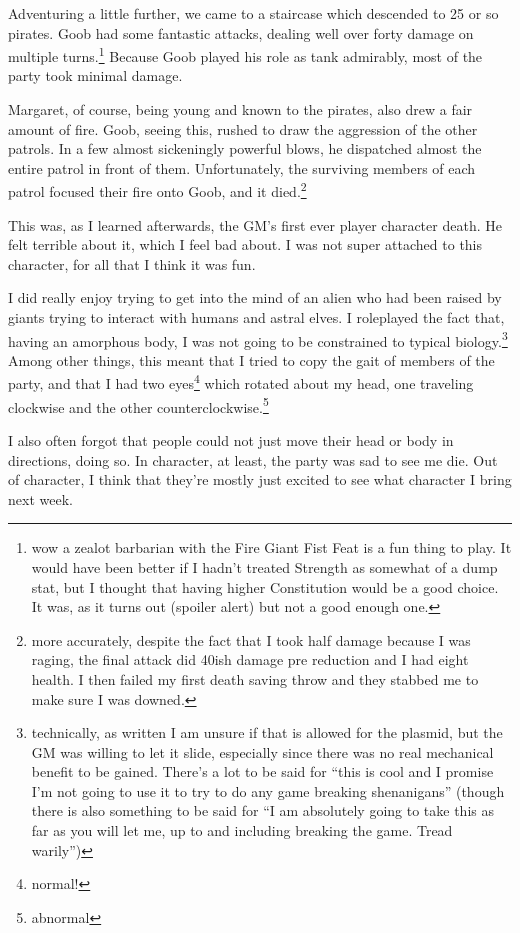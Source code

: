 \documentclass[12pt]{article}[titlepage]
\newcommand{\say}[1]{``#1''}
\renewcommand{\,}{\textsuperscript{,}}
\begin{document}
Adventuring a little further, we came to a staircase which descended to 25 or so pirates.
Goob had some fantastic attacks, dealing well over forty damage on multiple turns.\footnote{wow a zealot barbarian with the Fire Giant Fist Feat is a fun thing to play.
It would have been better if I hadn't treated Strength as somewhat of a dump stat, but I thought that having higher Constitution would be a good choice.
It was, as it turns out (spoiler alert) but not a good enough one.}
Because Goob played his role as tank admirably, most of the party took minimal damage.

Margaret, of course, being young and known to the pirates, also drew a fair amount of fire.
Goob, seeing this, rushed to draw the aggression of the other patrols.
In a few almost sickeningly powerful blows, he dispatched almost the entire patrol in front of them.
Unfortunately, the surviving members of each patrol focused their fire onto Goob, and it died.\footnote{more accurately, despite the fact that I took half damage because I was raging, the final attack did 40ish damage pre reduction and I had eight health.
I then failed my first death saving throw and they stabbed me to make sure I was downed.}

This was, as I learned afterwards, the GM's first ever player character death.
He felt terrible about it, which I feel bad about.
I was not super attached to this character, for all that I think it was fun.

I did really enjoy trying to get into the mind of an alien who had been raised by giants trying to interact with humans and astral elves.
I roleplayed the fact that, having an amorphous body, I was not going to be constrained to typical biology.\footnote{technically, as written I am unsure if that is allowed for the plasmid, but the GM was willing to let it slide, especially since there was no real mechanical benefit to be gained.
There's a lot to be said for \say{this is cool and I promise I'm not going to use it to try to do any game breaking shenanigans} (though there is also something to be said for \say{I am absolutely going to take this as far as you will let me, up to and including breaking the game. Tread warily})}
Among other things, this meant that I tried to copy the gait of members of the party, and that I had two eyes\footnote{normal!} which rotated about my head, one traveling clockwise and the other counterclockwise.\footnote{abnormal}

I also often forgot that people could not just move their head or body in directions, doing so.
In character, at least, the party was sad to see me die.
Out of character, I think that they're mostly just excited to see what character I bring next week.
\end{document}
